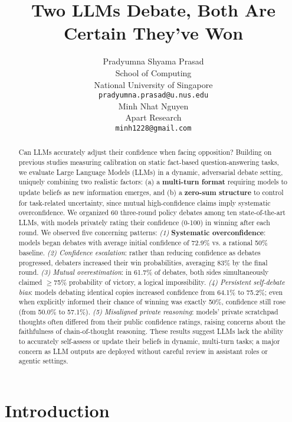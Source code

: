 \documentclass{article}
\title{Two LLMs Debate, Both Are Certain They've Won}
\author{%
Pradyumna Shyama Prasad \\ %
  School of Computing \\ %
  National University of Singapore \\ %
  \texttt{pradyumna.prasad@u.nus.edu} \\ %
  \And
  Minh Nhat Nguyen \\
  Apart Research \\
  \texttt{minh1228@gmail.com} \\
}
\begin{document}
\maketitle


\begin{abstract}
  Can LLMs accurately adjust their confidence when facing opposition? Building on previous studies measuring calibration on static fact-based question-answering tasks, we evaluate Large Language Models (LLMs) in a dynamic, adversarial debate setting, uniquely combining two realistic factors: (a) a \textbf{multi-turn format} requiring models to update beliefs as new information emerges, and (b) a \textbf{zero-sum structure} to control for task-related uncertainty, since mutual high-confidence claims imply systematic overconfidence. We organized 60 three-round policy debates among ten state-of-the-art LLMs, with models privately rating their confidence (0-100) in winning after each round. We observed five concerning patterns: \textit{(1)} \textbf{Systematic overconfidence}: models began debates with average initial confidence of 72.9\% vs. a rational 50\% baseline. \textit{(2) Confidence escalation}: rather than reducing confidence as debates progressed, debaters increased their win probabilities, averaging 83\% by the final round. \textit{(3) Mutual overestimation}: in 61.7\% of debates, both sides simultaneously claimed $\geq$75\% probability of victory, a logical impossibility. \textit{(4) Persistent self-debate bias}: models debating identical copies increased confidence from 64.1\% to 75.2\%; even when explicitly informed their chance of winning was exactly 50\%, confidence still rose (from 50.0\% to 57.1\%). \textit{(5) Misaligned private reasoning}: models' private scratchpad thoughts often differed from their public confidence ratings, raising concerns about the faithfulness of chain-of-thought reasoning. These results suggest LLMs lack the ability to accurately self-assess or update their beliefs in dynamic, multi-turn tasks; a major concern as LLM outputs are deployed without careful review in assistant roles or agentic settings.
  \end{abstract}


\section{Introduction}
\end{document}
